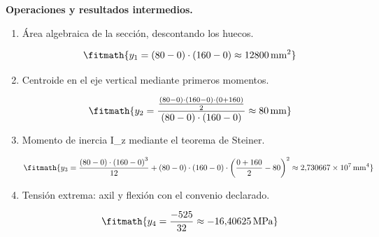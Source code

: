 \noindent\textbf{Operaciones y resultados intermedios.}

\begin{enumerate}

\item Área algebraica de la sección, descontando los huecos.

\[\fitmath{y_{1}=\left(80-0\right)\cdot \left(160-0\right)\approx 12800\,\mathrm{mm^{2}}}\]

\item Centroide en el eje vertical mediante primeros momentos.

\[\fitmath{y_{2}=\frac{\frac{\left(80-0\right)\cdot \left(160-0\right)\cdot \left(0+160\right)}{2}}{\left(80-0\right)\cdot \left(160-0\right)}\approx 80\,\mathrm{mm}}\]

\item Momento de inercia I\_z mediante el teorema de Steiner.

\[\fitmath{y_{3}=\frac{\left(80-0\right)\cdot {\left(160-0\right)}^{3}}{12}+\left(80-0\right)\cdot \left(160-0\right)\cdot {\left(\frac{0+160}{2}-80\right)}^{2}\approx 2{,}730667\times10^{7}\,\mathrm{mm^{4}}}\]

\item Tensión extrema: axil y flexión con el convenio declarado.

\[\fitmath{y_{4}=\frac{-525}{32}\approx -16{,}40625\,\mathrm{MPa}}\]

\end{enumerate}
